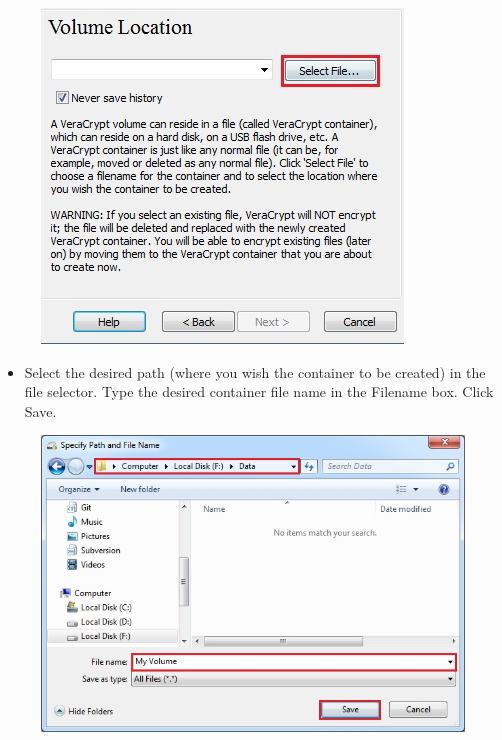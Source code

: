 \documentclass{tufte-handout}
\begin{document}
\begin{enumerate}
\begin{figure}
		\includegraphics[width=\linewidth]{img/vc_install_4.png}
	\end{figure}
	\begin{itemize}
		\item  Select the desired path (where you wish the container to be created) in the file selector. Type the desired container file name in the Filename box.
	Click Save.
	\end{itemize}
	\begin{figure}%
		\includegraphics[width=\linewidth]{img/vc_install_5.png}
	\end{figure}

\end{enumerate}
\end{document}
